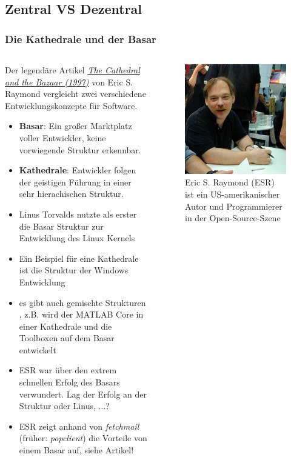 \documentclass{beamer}
\begin{document}
\subsection{Zentral VS Dezentral}

\begin{frame}\frametitle{Die Kathedrale und der Basar}
\begin{columns}
 \begin{scriptsize}        
        Der legendäre Artikel \href{http://www.catb.org/~esr/writings/cathedral-bazaar/hacker-history/hacker-history.ps}{\textit{The Cathedral and the Bazaar (1997)}} von Eric S. Raymond vergleicht zwei verschiedene Entwicklungskonzepte für Software. 
        
     
  \begin{itemize}
        \item \textbf{Basar}: Ein großer Marktplatz voller Entwickler, keine vorwiegende Struktur erkennbar.
        \item \textbf{Kathedrale}: Entwickler folgen der geistigen Führung in einer sehr hierachischen Struktur. 
		\item Linus Torvalds nutzte als erster die Basar Struktur zur Entwicklung des Linux Kernels
		\item Ein Beispiel für eine Kathedrale ist die Struktur der Windows Entwicklung		
		\item es gibt auch gemischte Strukturen , z.B. wird der MATLAB Core in einer Kathedrale und die Toolboxen auf dem Basar entwickelt 
		\item ESR war über den extrem schnellen Erfolg des Basars verwundert. Lag der Erfolg an der Struktur oder Linus, ...?
		\item ESR zeigt anhand von \textit{fetchmail} (früher: \textit{popclient}) die Vorteile von einem Basar auf, siehe Artikel!
\end{itemize}
\end{scriptsize}
    
\begin{figure} 
\includegraphics[scale=.45]{Bilder/esr.jpg}
\caption{{\scriptsize Eric S. Raymond (ESR) ist ein US-amerikanischer Autor und Programmierer in der Open-Source-Szene}}
\end{figure}


\end{columns}
\end{frame}
\end{document}
